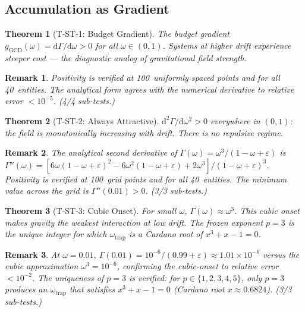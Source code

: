 \documentclass[
  aps,
  prd,
  twocolumn,
  superscriptaddress,
  nofootinbib,
  floatfix
]{revtex4-2}
\newtheorem{theorem}{Theorem}
\newtheorem{remark}{Remark}
\newcommand{\Gam}{\Gamma}
\newcommand{\eps}{\varepsilon}
\newcommand{\dd}{\mathrm{d}}
\begin{document}
\subsection{Accumulation as Gradient}

\begin{theorem}[T-ST-1: Budget Gradient]\label{thm:T1}
The budget gradient
$g_{\mathrm{GCD}}(\omega) = \dd\Gam/\dd\omega > 0$
for all $\omega \in (0,1)$.  Systems at higher drift
experience steeper cost --- the diagnostic analog of
gravitational field strength.
\end{theorem}

\begin{remark}
Positivity is verified at 100~uniformly spaced points and
for all 40~entities.  The analytical form agrees with the
numerical derivative to relative error $< 10^{-5}$.
(4/4 sub-tests.)
\end{remark}

\begin{theorem}[T-ST-2: Always Attractive]\label{thm:T2}
$\dd^2\Gam/\dd\omega^2 > 0$ everywhere in $(0,1)$: the field
is monotonically increasing with drift.  There is no
repulsive regime.
\end{theorem}

\begin{remark}
The analytical second derivative of
$\Gam(\omega) = \omega^3/(1 - \omega + \eps)$ is
$\Gam''(\omega) = [6\omega(1{-}\omega{+}\eps)^2 -
6\omega^2(1{-}\omega{+}\eps) + 2\omega^3] /
(1{-}\omega{+}\eps)^3$.  Positivity is verified at
100~grid points and for all 40~entities.  The minimum
value across the grid is $\Gam''(0.01) > 0$.
(3/3 sub-tests.)
\end{remark}

\begin{theorem}[T-ST-3: Cubic Onset]\label{thm:T3}
For small $\omega$, $\Gam(\omega) \approx \omega^3$.  This
cubic onset makes gravity the weakest interaction at low drift.
The frozen exponent $p = 3$ is the unique integer for which
$\omega_{\mathrm{trap}}$ is a Cardano root of
$x^3 + x - 1 = 0$.
\end{theorem}

\begin{remark}
At $\omega = 0.01$, $\Gam(0.01) = 10^{-6}/(0.99 + \eps)
\approx 1.01 \times 10^{-6}$ versus the cubic approximation
$\omega^3 = 10^{-6}$, confirming the cubic-onset to
relative error $< 10^{-2}$.  The uniqueness of $p = 3$
is verified: for $p \in \{1, 2, 3, 4, 5\}$, only $p = 3$
produces an $\omega_{\mathrm{trap}}$ that satisfies
$x^3 + x - 1 = 0$ (Cardano root $x \approx 0.6824$).
(3/3 sub-tests.)
\end{remark}
\end{document}
